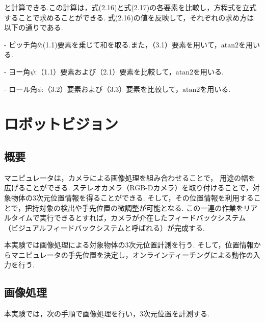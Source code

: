 と計算できる.この計算は，式(2.16)と式(2.17)の各要素を比較し，方程式を立式することで求めることができる.
式(2.16)の値を反映して，それぞれの求め方は以下の通りである.


- ピッチ角$\theta$:(1.1)要素を乗じて和を取る.また，（3.1）要素を用いて，$\text{atan2}$を用いる.


- ヨー角$\psi$:（1.1）要素および（2.1）要素を比較して，$\text{atan2}$を用いる.


- ロール角$\phi$:（3.2）要素および（3.3）要素を比較して，$\text{atan2}$を用いる.


\section{ロボットビジョン}

\subsection{概要}
マニピュレータは，カメラによる画像処理を組み合わせることで，
用途の幅を広げることができる.
ステレオカメラ（RGB-Dカメラ）を取り付けることで，対象物体の3次元位置情報を得ることができる.
そして，その位置情報を利用することで，把持対象の検出や手先位置の微調整が可能となる.
この一連の作業をリアルタイムで実行できるとすれば，カメラが介在したフィードバックシステム
（ビジュアルフィードバックシステムと呼ばれる）が完成する.

本実験では画像処理による対象物体の3次元位置計測を行う.
そして，位置情報からマニピュレータの手先位置を決定し，オンラインティーチングによる動作の入力を行う.

\subsection{画像処理}
本実験では，次の手順で画像処理を行い，3次元位置を計測する.

